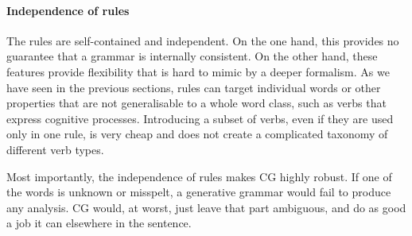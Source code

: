\paragraph{Independence of rules}
The rules are self-contained and independent.
On the one hand, this provides no guarantee that a grammar is internally consistent.
On the other hand, these features provide flexibility that is hard to mimic by a deeper formalism.
As we have seen in the previous sections, rules can target individual words
or other properties that are not generalisable to a whole word class,
such as verbs that express cognitive processes.
Introducing a subset of verbs, even if they are used only in one rule,
is very cheap and does not create a complicated taxonomy of different verb types.

Most importantly, the independence of rules makes CG highly robust.
If one of the words is unknown or misspelt, a generative grammar would fail to produce any analysis. 
CG would, at worst, just leave that part ambiguous, and do as good a job it can elsewhere in the sentence.






